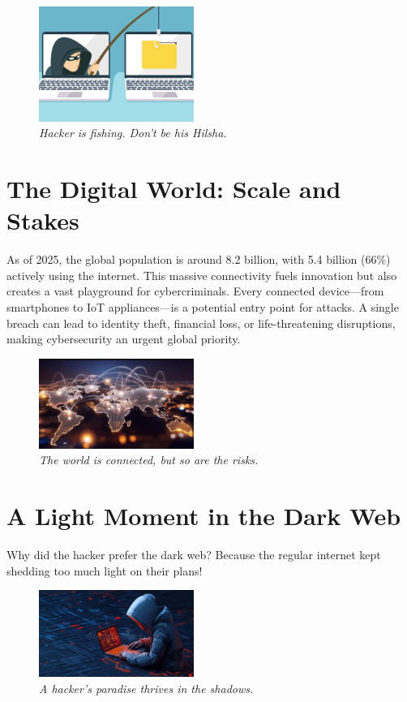 \documentclass[a4paper,10pt,twocolumn]{memoir}
\begin{document}
\begin{figure}[h]
  \centering
  \includegraphics[width=0.45\textwidth]{phishing.png}
  \caption*{\textit{Hacker is fishing. Don't be his Hilsha.}}
\end{figure}

\section*{The Digital World: Scale and Stakes}
As of 2025, the global population is around 8.2 billion, with 5.4 billion (66\%) actively using the internet. This massive connectivity fuels innovation but also creates a vast playground for cybercriminals. Every connected device—from smartphones to IoT appliances—is a potential entry point for attacks. A single breach can lead to identity theft, financial loss, or life-threatening disruptions, making cybersecurity an urgent global priority.

\begin{figure}[h]
  \centering
  \includegraphics[width=0.45\textwidth]{world.png}
  \caption*{\textit{The world is connected, but so are the risks.}}
\end{figure}

\section*{A Light Moment in the Dark Web}
Why did the hacker prefer the dark web? Because the regular internet kept shedding too much light on their plans!

\begin{figure}[h]
  \centering
  \includegraphics[width=0.45\textwidth]{hacker.png}
  \caption*{\textit{A hacker's paradise thrives in the shadows.}}
\end{figure}
\end{document}
